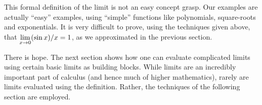 This formal definition of the limit is not an easy concept grasp. Our examples are actually ``easy'' examples, using ``simple'' functions like polynomials, square-roots and exponentials. It is very difficult to prove, using the techniques given above, that $\displaystyle \lim_{x\to 0}(\sin x)/x = 1$, as we approximated in the previous section.

There is hope. The next section shows how one can evaluate complicated limits using certain basic limits as building blocks. While limits are an incredibly important part of calculus (and hence much of higher mathematics), rarely are limits evaluated using the definition. Rather, the techniques of the following section are employed.


